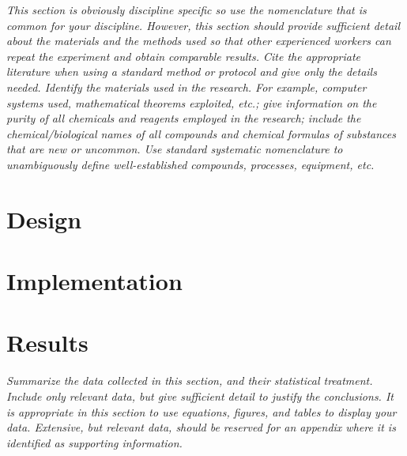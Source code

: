\documentclass[11pt,a4paper,oneside]{report}
\newcommand{\instructions}[1]{{\color{orange}\itshape #1}}
\begin{document}
\instructions{This section is obviously discipline specific so use the
    nomenclature that is common for your discipline. However, this section
    should provide sufficient detail about the materials and the methods
    used so that other experienced workers can repeat the experiment and
    obtain comparable results. Cite the appropriate literature when using a
    standard method or protocol and give only the details needed. Identify
    the materials used in the research. For example, computer systems used,
    mathematical theorems exploited, etc.; give information on the purity of
    all chemicals and reagents employed in the research; include the
    chemical/biological names of all compounds and chemical formulas of
    substances that are new or uncommon. Use standard systematic
    nomenclature to unambiguously define well-established compounds,
    processes, equipment, etc.}




\chapter{Design}
\label{design}




\chapter{Implementation}
\label{implementation}




\chapter{Results}
\label{results}

\instructions{Summarize the data collected in this section, and their
    statistical treatment. Include only relevant data, but give sufficient
    detail to justify the conclusions. It is appropriate in this section to
    use equations, figures, and tables to display your data. Extensive, but
    relevant data, should be reserved for an appendix where it is identified
    as supporting information.}
\end{document}
